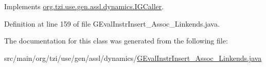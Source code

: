 Implements \hyperlink{interfaceorg_1_1tzi_1_1use_1_1gen_1_1assl_1_1dynamics_1_1_i_g_caller_a8dc6abb36ee44d8e73a0b506764bd1e1}{org.\-tzi.\-use.\-gen.\-assl.\-dynamics.\-I\-G\-Caller}.



Definition at line 159 of file G\-Eval\-Instr\-Insert\-\_\-\-Assoc\-\_\-\-Linkends.\-java.



The documentation for this class was generated from the following file\-:\begin{DoxyCompactItemize}
\item 
src/main/org/tzi/use/gen/assl/dynamics/\hyperlink{_g_eval_instr_insert___assoc___linkends_8java}{G\-Eval\-Instr\-Insert\-\_\-\-Assoc\-\_\-\-Linkends.\-java}\end{DoxyCompactItemize}
